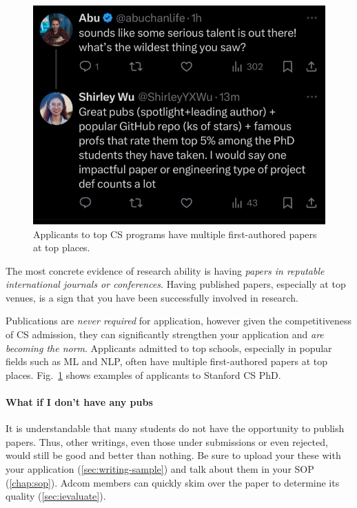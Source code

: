 \documentclass[oneside,11pt,dvipsnames]{book}
\begin{document}
\begin{figure}
    \begin{center}
        \includegraphics[scale=0.3]{files/wu.jpeg}
    \end{center}
    \caption{Applicants to top CS programs have multiple first-authored papers at top places.}\label{fig:wu}
\end{figure}  


The most concrete evidence of research ability is having \emph{papers in reputable international journals or conferences}.
Having published papers, especially at top venues, is a sign that you have been successfully involved in research. 

Publications are \emph{never required} for application, however given the competitiveness of CS admission, they can significantly strengthen your application and \emph{are becoming the norm}. Applicants admitted to top schools, especially in popular fields such as ML and NLP, often have multiple first-authored papers at top places. Fig.~\ref{fig:wu} shows examples of applicants to Stanford CS PhD.



\paragraph{What if I don't have any pubs} It is understandable that many students do not have the opportunity to publish papers. Thus, other writings, even those under submissions or even rejected, would still be good and better than nothing. 
Be sure to upload your these with your application (\autoref{sec:writing-sample}) and talk about them in your SOP (\autoref{chap:sop}). Adcom members can quickly skim over the paper to determine its quality (\autoref{sec:ievaluate}).
\end{document}
